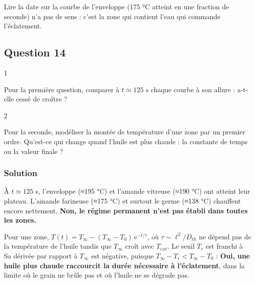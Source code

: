 \documentclass[11pt,a4paper]{article}
\newcommand{\equationajustee}[1]{%
  \sbox{\boiteequation}{$\displaystyle #1$}%
  \ifdim\wd\boiteequation>\linewidth
    \[\resizebox{\linewidth}{!}{\usebox{\boiteequation}}\]%
  \else
    \[#1\]%
  \fi}
\begin{document}
\begin{piege}

Lire la date sur la courbe de l'enveloppe (175 °C atteint en une fraction de seconde) n'a pas de sens : c'est la zone qui contient l'eau qui commande l'éclatement.

\end{piege}

\hypertarget{question-14}{%
\subsection{Question 14}\label{question-14}}

\begin{indication}{1}

Pour la première question, comparer à \(t\simeq125\) s chaque courbe à son allure : a-t-elle cessé de croître ?

\end{indication}

\begin{indication}{2}

Pour la seconde, modéliser la montée de température d'une zone par un premier ordre. Qu'est-ce qui change quand l'huile est plus chaude : la constante de temps ou la valeur finale ?

\end{indication}

\hypertarget{solution-13}{%
\subsubsection{Solution}\label{solution-13}}

À \(t\simeq125\) s, l'enveloppe (≈195 °C) et l'amande vitreuse (≈190 °C) ont atteint leur plateau. L'amande farineuse (≈175 °C) et surtout le germe (≈138 °C) chauffent encore nettement. \textbf{Non, le régime permanent n'est pas établi dans toutes les zones.}

Pour une zone, \(T(t)=T_\infty-(T_\infty-T_0)\,\mathrm e^{-t/\tau}\), où \(\tau\sim\ell^2/D_{th}\) ne dépend pas de la température de l'huile tandis que \(T_\infty\) croît avec \(T_{ext}\). Le seuil \(T_r\) est franchi à
\equationajustee{t_r=\tau\ln\frac{T_\infty-T_0}{T_\infty-T_r}}
Sa dérivée par rapport à \(T_\infty\) est négative, puisque \(T_\infty-T_r<T_\infty-T_0\) :
\equationajustee{\frac{\mathrm dt_r}{\mathrm dT_\infty}=\tau\left(\frac1{T_\infty-T_0}-\frac1{T_\infty-T_r}\right)<0} \textbf{Oui, une huile plus chaude raccourcit la durée nécessaire à l'éclatement}, dans la limite où le grain ne brûle pas et où l'huile ne se dégrade pas.
\end{document}
